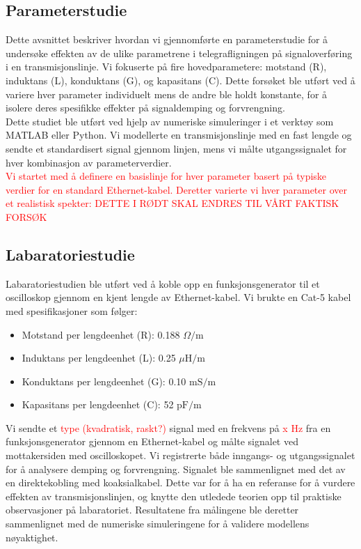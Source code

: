 \subsection{Parameterstudie}

Dette avsnittet beskriver hvordan vi gjennomførte en parameterstudie for å undersøke effekten av de ulike parametrene i telegrafligningen på signaloverføring i en transmisjonslinje. Vi fokuserte på fire hovedparametere: motstand (R), induktans (L), konduktans (G), og kapasitans (C). Dette forsøket ble utført ved å variere hver parameter individuelt mens de andre ble holdt konstante, for å isolere deres spesifikke effekter på signaldemping og forvrengning. \\ Dette studiet ble utført ved hjelp av numeriske simuleringer i et verktøy som MATLAB eller Python. Vi modellerte en transmisjonslinje med en fast lengde og sendte et standardisert signal gjennom linjen, mens vi målte utgangssignalet for hver kombinasjon av parameterverdier. \\ \textcolor{red}{Vi startet med å definere en basislinje for hver parameter basert på typiske verdier for en standard Ethernet-kabel. Deretter varierte vi hver parameter over et realistisk spekter: DETTE I RØDT SKAL ENDRES TIL VÅRT FAKTISK FORSØK}

\subsection{Labaratoriestudie}

Labaratoriestudien ble utført ved å koble opp en funksjonsgenerator til et oscilloskop gjennom en kjent lengde av Ethernet-kabel. Vi brukte en Cat-5 kabel med spesifikasjoner som følger:
\begin{itemize}
    \item Motstand per lengdeenhet (R): 0.188 $\Omega/\mathrm{m}$
    \item Induktans per lengdeenhet (L): 0.25 $\mu \mathrm{H}/\mathrm{m}$
    \item Konduktans per lengdeenhet (G): 0.10 $\mathrm{mS}/\mathrm{m}$
    \item Kapasitans per lengdeenhet (C): 52 $\mathrm{pF}/\mathrm{m}$
\end{itemize}
Vi sendte et \textcolor{red}{type (kvadratisk, raskt?)} signal med en frekvens på \textcolor{red}{x Hz} fra en funksjonsgenerator gjennom en Ethernet-kabel og målte signalet ved mottakersiden med oscilloskopet. Vi registrerte både inngangs- og utgangssignalet for å analysere demping og forvrengning. Signalet ble sammenlignet med det av en direktekobling med koaksialkabel. Dette var for å ha en referanse for å vurdere effekten av transmisjonslinjen, og knytte den utledede teorien opp til praktiske observasjoner på labaratoriet. Resultatene fra målingene ble deretter sammenlignet med de numeriske simuleringene for å validere modellens nøyaktighet.
\fi